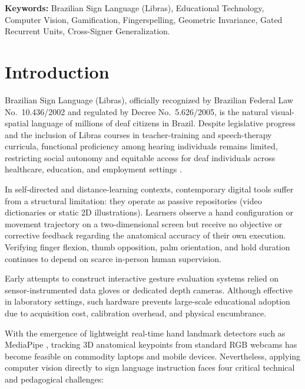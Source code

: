 \documentclass[12pt,a4paper]{article}
\begin{document}
\vspace{0.4cm}

\noindent
\textbf{Keywords:}
Brazilian Sign Language (Libras),
Educational Technology,
Computer Vision,
Gamification,
Fingerspelling,
Geometric Invariance,
Gated Recurrent Units,
Cross-Signer Generalization.


\section{Introduction}
\label{sec:introduction}

Brazilian Sign Language (Libras), officially recognized by Brazilian Federal Law No.~10.436/2002 and regulated by Decree No.~5.626/2005, is the natural visual-spatial language of millions of deaf citizens in Brazil. Despite legislative progress and the inclusion of Libras courses in teacher-training and speech-therapy curricula, functional proficiency among hearing individuals remains limited, restricting social autonomy and equitable access for deaf individuals across healthcare, education, and employment settings \citep{dasilva2020health,passos2021gei}.

In self-directed and distance-learning contexts, contemporary digital tools suffer from a structural limitation: they operate as passive repositories (video dictionaries or static 2D illustrations). Learners observe a hand configuration or movement trajectory on a two-dimensional screen but receive no objective or corrective feedback regarding the anatomical accuracy of their own execution. Verifying finger flexion, thumb opposition, palm orientation, and hold duration continues to depend on scarce in-person human supervision.

Early attempts to construct interactive gesture evaluation systems relied on sensor-instrumented data gloves or dedicated depth cameras. Although effective in laboratory settings, such hardware prevents large-scale educational adoption due to acquisition cost, calibration overhead, and physical encumbrance.

With the emergence of lightweight real-time hand landmark detectors such as MediaPipe \citep{rezende2021minds,rego2025fft}, tracking 3D anatomical keypoints from standard RGB webcams has become feasible on commodity laptops and mobile devices. Nevertheless, applying computer vision directly to sign language instruction faces four critical technical and pedagogical challenges:
\end{document}
